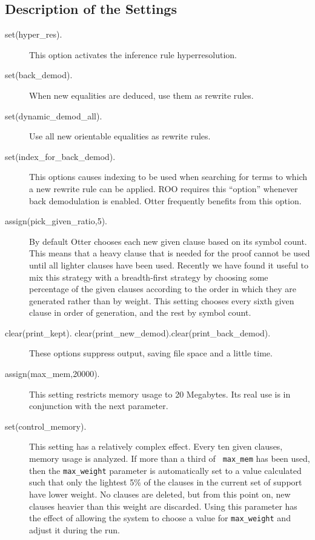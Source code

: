 \subsection{Description of the Settings}                                                                      
\begin{description}
\item[set(hyper\_res).] 
This option activates the inference rule hyperresolution.

\item[set(back\_demod).] 
When new equalities are deduced, use them as rewrite rules.

\item[set(dynamic\_demod\_all).] 
Use all new orientable equalities as rewrite rules.

\item[set(index\_for\_back\_demod).] 
This options causes indexing to be used when searching for terms
to which a new rewrite rule can be applied.  ROO requires this
``option'' whenever back demodulation is enabled.  Otter frequently
benefits from this option.

\item[assign(pick\_given\_ratio,5).] 
By default Otter chooses each new given clause based on its symbol
count.  This means that a heavy clause that is needed for the proof
cannot be used until all lighter clauses have been used.  Recently we
have found it useful to mix this strategy with a breadth-first
strategy by choosing some percentage of the given clauses according to
the order in which they are generated rather than by weight.  This
setting chooses every sixth given clause in order of generation, and
the rest by symbol count.

\item[clear(print\_kept). clear(print\_new\_demod).clear(print\_back\_demod).] 
These options suppress output, saving file space and a little time.

\item[assign(max\_mem,20000).] 
This setting restricts memory usage to 20 Megabytes.  Its real use is in
conjunction with the next parameter.

\item[set(control\_memory).] 
This setting has a relatively complex effect.  Every ten given
clauses, memory usage is analyzed.  If more than a third of {\tt
max\_mem} has been used, then the {\tt max\_weight} parameter is
automatically set to a value calculated such that only the lightest
5\% of the clauses in the current set of support have lower weight.
No clauses are deleted, but from this point on, new clauses heavier
than this weight are discarded.  Using this parameter has the effect
of allowing the system to choose a value for {\tt max\_weight} and
adjust it during the run.


\end{description}
